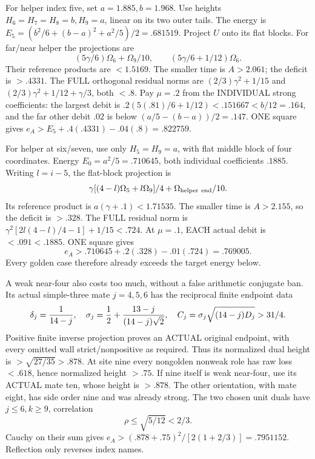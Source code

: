 For helper index five, set \(a=1.885,b=1.968\).
Use heights \(H_6=H_7=H_8=b,H_9=a\), linear
on its two outer tails.
The energy is
\(E_5=(b^2/6+(b-a)^2+a^2/5)/2=.681519\).
Project \(U\) onto its flat blocks.
For far/near helper the projections are
\[
 (5\gamma/6)\Omega_6+\Omega_9/10,\qquad
 (5\gamma/6+1/12)\Omega_6 .
\]
Their reference products are \(<1.5169\).
The smaller time is \(A>2.061\); the deficit
is \(>.4331\).
The FULL orthogonal residual norms are
\((2/3)\gamma^2+1/15\) and
\((2/3)\gamma^2+1/12+\gamma/3\), both \(<.8\).
Pay \(\mu=.2\) from the INDIVIDUAL strong
coefficients: the largest debit is
\(.2(5(.81)/6+1/12)<.151667<b/12=.164\),
and the far other debit \(.02\) is below
\((a/5-(b-a))/2=.147\).
ONE square gives
\(e_A>E_5+.4(.4331)-.04(.8)=.822759\).

For helper at six/seven, use only
\(H_5=H_9=a\), with flat middle block of four
coordinates.
Energy \(E_0=a^2/5=.710645\), both individual
coefficients \(.1885\).
Writing \(l=i-5\), the flat-block projection is
\[
 \gamma[(4-l)\Omega_5+l\Omega_9]/4
                         +\Omega_{\rm helper\ end}/10 .
\]
Its reference product is
\(a(\gamma+.1)<1.71535\).
The smaller time is \(A>2.155\), so the
deficit is \(>.328\).
The FULL residual norm is
\(\gamma^2[2l(4-l)/4-1]+1/15<.724\).
At \(\mu=.1\), EACH actual debit is
\(<.091<.1885\).
ONE square gives
\[
                           e_A>.710645+.2(.328)-.01(.724)
                                      =.769005 .
\]
Every golden case therefore already exceeds
the target energy below.

A weak near-four also costs too much, without
a false arithmetic conjugate ban.
Its actual simple-three mate \(j=4,5,6\) has
the reciprocal finite endpoint data
\[
 \delta_j={1\over14-j},\quad
 \sigma_j={1\over2}+{13-j\over(14-j)\sqrt2},\quad
 C_j=\sigma_j\sqrt{(14-j)D_j}>31/4 .
\]
Positive finite inverse projection proves an
ACTUAL original endpoint, with every omitted
wall strict/nonpositive as required.
Thus its normalized dual height is
\(>\sqrt{27/35}>.878\).
At site nine every nongolden nonweak role has
raw loss \(<.618\), hence normalized height
\(>.75\).
If nine itself is weak near-four, use its
ACTUAL mate ten, whose height is \(>.878\).
The other orientation, with mate eight, has
side order nine and was already strong.
The two chosen unit duals have \(j\le6,k\ge9\),
correlation
\[
                         \rho\le\sqrt{5/12}<2/3 .
\]
Cauchy on their sum gives
\(e_A>(.878+.75)^2/[2(1+2/3)]=.7951152\).
Reflection only reverses index names.

